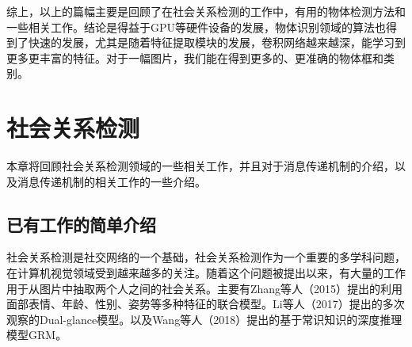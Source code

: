 综上，以上的篇幅主要是回顾了在社会关系检测的工作中，有用的物体检测方法和一些相关工作。结论是得益于GPU等硬件设备的发展，物体识别领域的算法也得到了快速的发展，尤其是随着特征提取模块的发展，卷积网络越来越深，能学习到更多更丰富的特征。对于一幅图片，我们能在得到更多的、更准确的物体框和类别。

\section{社会关系检测}
本章将回顾社会关系检测领域的一些相关工作，并且对于消息传递机制的介绍，以及消息传递机制的相关工作的一些介绍。

\subsection{已有工作的简单介绍}

社会关系检测是社交网络的一个基础，社会关系检测作为一个重要的多学科问题，在计算机视觉领域受到越来越多的关注。随着这个问题被提出以来，有大量的工作用于从图片中抽取两个人之间的社会关系。主要有Zhang等人（2015）\cite{DBLP:conf/iccv/ZhangLLT15}提出的利用面部表情、年龄、性别、姿势等多种特征的联合模型。Li等人（2017）\cite{DBLP:conf/iccv/LiWZK17}提出的多次观察的Dual-glance模型。以及Wang等人（2018）\cite{DBLP:conf/ijcai/WangCRYCL18}提出的基于常识知识的深度推理模型GRM。

